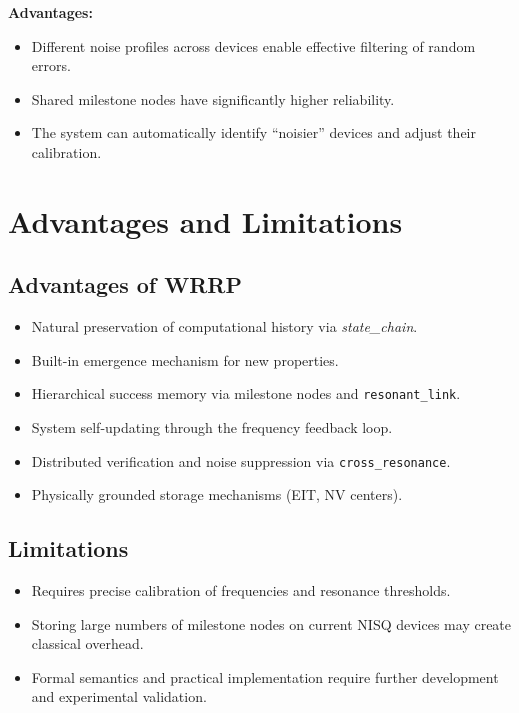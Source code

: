 \documentclass[11pt,a4paper]{article}
\begin{document}
\textbf{Advantages:}
\begin{itemize}[leftmargin=*]
    \item Different noise profiles across devices enable effective filtering of random errors.
    \item Shared milestone nodes have significantly higher reliability.
    \item The system can automatically identify ``noisier'' devices and adjust their calibration.
\end{itemize}

\section{Advantages and Limitations}

\subsection*{Advantages of WRRP}
\begin{itemize}[leftmargin=*]
    \item Natural preservation of computational history via \textit{state\_chain}.
    \item Built-in emergence mechanism for new properties.
    \item Hierarchical success memory via milestone nodes and \texttt{resonant\_link}.
    \item System self-updating through the frequency feedback loop.
    \item Distributed verification and noise suppression via \texttt{cross\_resonance}.
    \item Physically grounded storage mechanisms (EIT, NV centers).
\end{itemize}

\subsection*{Limitations}
\begin{itemize}[leftmargin=*]
    \item Requires precise calibration of frequencies and resonance thresholds.
    \item Storing large numbers of milestone nodes on current NISQ devices may create classical overhead.
    \item Formal semantics and practical implementation require further development and experimental validation.
\end{itemize}
\end{document}
